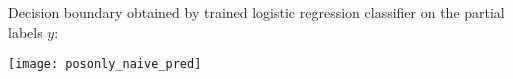 \begin{answer}
\graphicspath{ {./posonly/} }
	Decision boundary obtained by trained logistic regression classifier on the partial labels $y$:

\texttt{[image: posonly\_naive\_pred]}


\end{answer}
